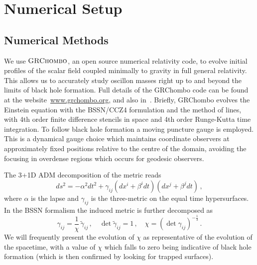 \documentclass[11pt,a4paper]{article}
\begin{document}
\section{Numerical Setup}
\label{sec:NumericalSetup}

\subsection{Numerical Methods}
\label{sec:NumericalMethod}

We use $\textsc{GRChombo}$, an open source numerical relativity code, to evolve initial profiles of the scalar field coupled minimally to gravity in full general relativity. This allows us to accurately study oscillon masses right up to and beyond the limits of black hole formation. 
Full details of the GRChombo code can be found at the website~\url{www.grchombo.org}, and also in~\cite{Clough:2015sqa}. 
Briefly, GRChombo evolves the Einstein equation with the BSSN/CCZ4 formulation 
and the method of lines, with 4th order finite difference stencils in space and 4th order Runge-Kutta time integration. To follow black hole formation a moving puncture gauge is employed. This is a dynamical gauge choice which maintains coordinate observers at approximately fixed positions relative to the centre of the domain,
avoiding the focusing in overdense regions which occurs for geodesic observers.

The 3+1D ADM decomposition of the metric reads
\begin{equation}
ds^2 = - \alpha^2 dt^2 + \gamma_{ij} (dx^i + \beta^i dt) (dx^j + \beta^j dt) \,, \label{eq-metric}
\end{equation}
where $\alpha$ is the lapse and $\gamma_{ij}$ is the three-metric on the equal time hypersurfaces. In the BSSN formalism the induced metric is further decomposed as 
\begin{equation}
\gamma_{ij}=\frac{1}{\chi}\,\tilde\gamma_{ij}\,, \quad \det\tilde\gamma_{ij}=1\,, \quad \chi = \left(\det\gamma_{ij}\right)^{-\frac{1}{3}}  \,.
\label{eq-chi}
\end{equation}
We will frequently present the evolution of $\chi$ as representative of the evolution of the spacetime, with a value of $\chi$ which falls to zero being indicative of black hole formation (which is then confirmed by looking for trapped surfaces).
\end{document}
